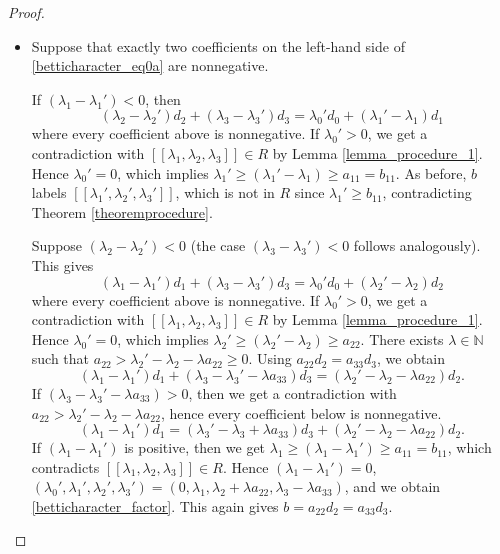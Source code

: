 \documentclass[12pt]{article}
\theoremstyle{remark}
\begin{document}
\begin{proof}
\begin{itemize}
    \item 
    Suppose that exactly two coefficients on the left-hand side of \eqref{betticharacter_eq0a} are nonnegative. 
    
    If $(\lambda_1-\lambda_1') < 0$, then
    \begin{equation}
        (\lambda_2-\lambda_2')d_2 +  (\lambda_3-\lambda_3')d_3 = \lambda_0'd_0 +  (\lambda_1'-\lambda_1)d_1
    \end{equation}
    where every coefficient above is nonnegative. If $\lambda_0' > 0$, we get a contradiction with $[[\lambda_1,\lambda_2,\lambda_3]] \in  R$ by Lemma \ref{lemma_procedure_1}. Hence $\lambda_0' = 0$, which implies $\lambda_1' \geq (\lambda_1'-\lambda_1) \geq a_{11} = b_{11}$. As before, $b$ labels $[[\lambda_1',\lambda_2',\lambda_3']]$, which is not in $R$ since $\lambda_1' \geq b_{11}$, contradicting Theorem \ref{theoremprocedure}.  

    Suppose $(\lambda_2-\lambda_2')<0$ (the case $(\lambda_3-\lambda_3') < 0$ follows analogously). This gives
    \begin{equation}
        (\lambda_1-\lambda_1')d_1 +  (\lambda_3-\lambda_3')d_3 = \lambda_0'd_0 +  (\lambda_2'-\lambda_2)d_2
    \end{equation}
    where every coefficient above is nonnegative. If $\lambda_0' > 0$, we get a contradiction with $[[\lambda_1,\lambda_2,\lambda_3]] \in R$ by Lemma \ref{lemma_procedure_1}. Hence $\lambda_0' = 0$, which implies $\lambda_2' \geq (\lambda_2'-\lambda_2) \geq a_{22}$.  There exists $\lambda \in \mathbb{N}$ such that $a_{22} > \lambda_2'-\lambda_2 - \lambda a_{22} \geq 0$. Using $a_{22}d_2 = a_{33}d_3$, we obtain 
    \begin{equation}
               (\lambda_1-\lambda_1')d_1 + (\lambda_3-\lambda_3'-\lambda a_{33} )d_3 = (\lambda_2'-\lambda_2- \lambda a_{22} )d_2.
    \end{equation}
    If $(\lambda_3-\lambda_3'-\lambda a_{33} ) > 0$, then we get a contradiction with $a_{22} > \lambda_2'-\lambda_2 - \lambda a_{22}$, hence every coefficient below is nonnegative.
    \begin{equation}
               (\lambda_1-\lambda_1')d_1 = (\lambda_3'-\lambda_3+\lambda a_{33} )d_3 + (\lambda_2'-\lambda_2- \lambda a_{22} )d_2.
    \end{equation}
     If $(\lambda_1-\lambda_1')$ is positive, then we get $\lambda_1 \geq (\lambda_1-\lambda_1') \geq a_{11} = b_{11}$, which contradicts $[[\lambda_1,\lambda_2,\lambda_3]] \in R$. 
     Hence $(\lambda_1-\lambda_1') = 0$, $(\lambda_0',\lambda_1',\lambda_2', \lambda_3') = (0,\lambda_1,\lambda_2 + \lambda a_{22} , \lambda_3 - \lambda a_{33} )$, and we obtain \eqref{betticharacter_factor}. This again gives $b =a_{22}d_2 =a_{33}d_3$. \qedhere   
    \end{itemize}  
\end{proof}
\end{document}
